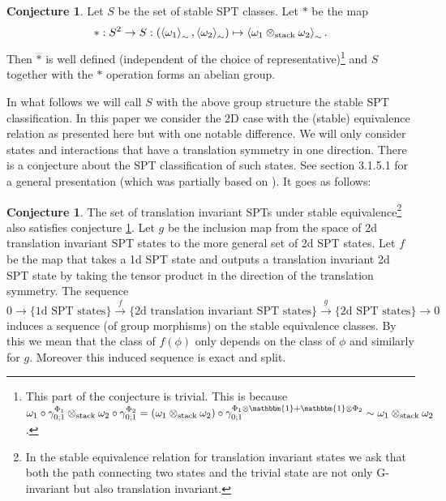 \documentclass[12pt,a4paper,twoside]{article}
\newcommand{\id}{\mathbbm{1}}
\theoremstyle{definition}
\newtheorem{conjecture}[theorem]{Conjecture}
\numberwithin{equation}{section}
\begin{document}
\begin{conjecture}\label{conj:StableEquivGroupStructure}
	Let $S$ be the set of stable SPT classes. Let $*$ be the map
	\begin{equation}
		*:S^2\rightarrow S:(\expval{\omega_1}_\sim,\expval{\omega_2}_\sim)\mapsto \expval{\omega_1\otimes_\text{stack}\omega_2}_\sim.
	\end{equation}
	Then $*$ is well defined (independent of the choice of representative)\footnote{This part of the conjecture is trivial. This is because $\omega_1\circ\gamma^{\Phi_1}_{0;1}\otimes_\text{stack}\omega_2\circ\gamma^{\Phi_2}_{0;1}=(\omega_1\otimes_{\text{stack}}\omega_2)\circ\gamma^{\Phi_1\otimes\id+\id\otimes\Phi_2}_{0;1}\sim\omega_1\otimes_{\text{stack}}\omega_2$.} and $S$ together with the $*$ operation forms an abelian group.
\end{conjecture}
In what follows we will call $S$ with the above group structure the stable SPT classification. In this paper we consider the 2D case with the (stable) equivalence relation as presented here but with one notable difference. We will only consider states and interactions that have a translation symmetry in one direction. There is a conjecture about the SPT classification of such states. See \cite{xiong2019classification} section 3.1.5.1 for a general presentation (which was partially based on \cite{Chen_2013}). It goes as follows:
\begin{conjecture}\label{conj}
	The set of translation invariant SPTs under stable equivalence\footnote{In the stable equivalence relation for translation invariant states we ask that both the path connecting two states and the trivial state are not only G-invariant but also translation invariant.} also satisfies conjecture \ref{conj:StableEquivGroupStructure}. Let $g$ be the inclusion map from the space of 2d translation invariant SPT states to the more general set of 2d SPT states. Let $f$ be the map that takes a 1d SPT state and outputs a translation invariant 2d SPT state by taking the tensor product in the direction of the translation symmetry. The sequence
	\begin{equation}
		0\rightarrow\{\text{1d SPT states}\}\stackrel{f}{\rightarrow}\{\text{2d translation invariant SPT states}\}\stackrel{g}{\rightarrow}\{\text{2d SPT states}\}\rightarrow 0
	\end{equation}
	induces a sequence (of group morphisms) on the stable equivalence classes. By this we mean that the class of $f(\phi)$ only depends on the class of $\phi$ and similarly for $g$. Moreover this induced sequence is exact and split.
\end{conjecture}
\end{document}
